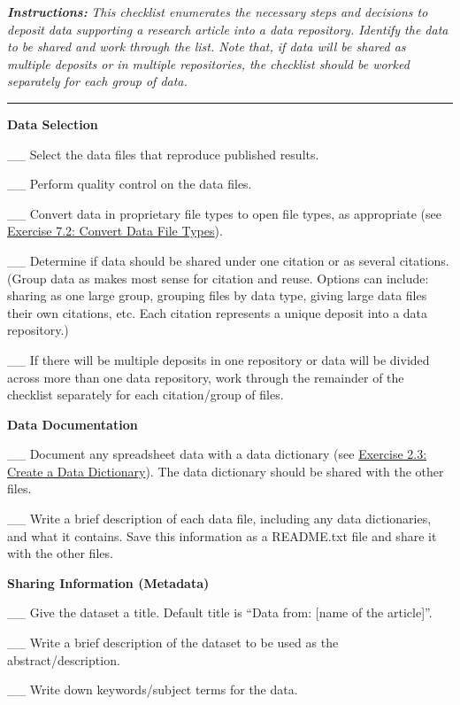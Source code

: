 \documentclass[
]{book}
\begin{document}
\textbf{\emph{Instructions:}} \emph{This checklist enumerates the necessary steps and decisions to deposit data supporting a research article into a data repository. Identify the data to be shared and work through the list. Note that, if data will be shared as multiple deposits or in multiple repositories, the checklist should be worked separately for each group of data.}

\begin{center}\rule{0.5\linewidth}{0.5pt}\end{center}

\textbf{Data Selection}

\_\_ Select the data files that reproduce published results.

\_\_ Perform quality control on the data files.

\_\_ Convert data in proprietary file types to open file types, as appropriate (see \protect\hyperlink{file-type}{Exercise 7.2: Convert Data File Types}).

\_\_ Determine if data should be shared under one citation or as several citations. (Group data as makes most sense for citation and reuse. Options can include: sharing as one large group, grouping files by data type, giving large data files their own citations, etc. Each citation represents a unique deposit into a data repository.)

\_\_ If there will be multiple deposits in one repository or data will be divided across more than one data repository, work through the remainder of the checklist separately for each citation/group of files.

\textbf{Data Documentation}

\_\_ Document any spreadsheet data with a data dictionary (see \protect\hyperlink{data-dictionary}{Exercise 2.3: Create a Data Dictionary}). The data dictionary should be shared with the other files.

\_\_ Write a brief description of each data file, including any data dictionaries, and what it contains. Save this information as a README.txt file and share it with the other files.

\textbf{Sharing Information (Metadata)}

\_\_ Give the dataset a title. Default title is ``Data from: {[}name of the article{]}''.

\_\_ Write a brief description of the dataset to be used as the abstract/description.

\_\_ Write down keywords/subject terms for the data.
\end{document}
